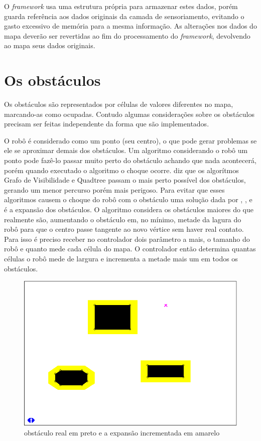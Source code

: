 O \textit{framework} usa uma estrutura própria para armazenar estes dados, porém guarda referência aos dados originais da camada de sensoriamento, evitando o gasto excessivo de memória para a mesma informação. As alterações nos dados do mapa deverão ser revertidas ao fim do processamento do \textit{framework}, devolvendo ao mapa seus dados originais.

\section{Os obstáculos}

Os obstáculos são representados por células de valores diferentes no mapa, marcando-as como ocupadas. Contudo algumas considerações sobre os obstáculos precisam ser feitas independente da forma que são implementados.

O robô é considerado como um ponto (seu centro), o que pode gerar problemas se ele se aproximar demais dos obstáculos. Um algoritmo considerando o robô um ponto pode fazê-lo passar muito perto do obstáculo achando que nada acontecerá, porém quando executado o algoritmo o choque ocorre. \cite{Guzman2008} diz que os algorítmos Grafo de Visibilidade e Quadtree passam o mais perto possível dos obstáculos, gerando um menor percurso porém mais perigoso. Para evitar que esses algoritmos causem o choque do robô com o obstáculo uma solução dada por \cite{Souza2008}, \cite{Guzman2008}, \cite{Siegwart2004} e \cite{Thomsen2010} é a expansão dos obstáculos. O algoritmo considera os obstáculos maiores do que realmente são, aumentando o obstáculo em, no mínimo, metade da lagura do robô para que o centro passe tangente ao novo vértice sem haver real contato. Para isso é preciso receber no controlador dois parâmetro a mais, o tamanho do robô e quanto mede cada célula do mapa. O controlador então determina quantas células o robô mede de largura e incrementa a metade mais um em todos os obstáculos.

\begin{figure}[h]
	\centering
	\label{fig28}
		\includegraphics[keepaspectratio=true,scale=0.5]{figuras/expansao.png}
	\caption{obstáculo real em preto e a expansão incrementada em amarelo \cite{MRIT_SITE}}
\end{figure}

